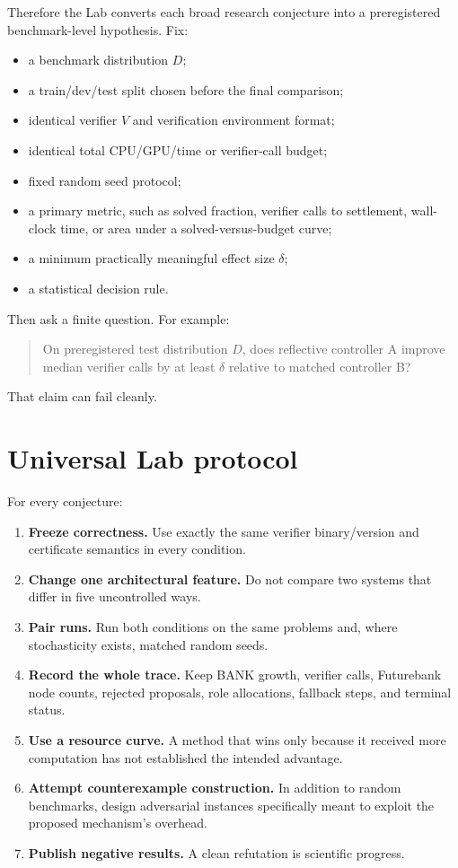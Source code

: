 \documentclass[11pt,openany]{book}
\theoremstyle{definition}
\theoremstyle{remark}
\begin{document}
Therefore the Lab converts each broad research conjecture into a preregistered benchmark-level hypothesis. Fix:
\begin{itemize}
\item a benchmark distribution $D$;
\item a train/dev/test split chosen before the final comparison;
\item identical verifier $V$ and verification environment format;
\item identical total CPU/GPU/time or verifier-call budget;
\item fixed random seed protocol;
\item a primary metric, such as solved fraction, verifier calls to settlement, wall-clock time, or area under a solved-versus-budget curve;
\item a minimum practically meaningful effect size $\delta$;
\item a statistical decision rule.
\end{itemize}
Then ask a finite question. For example:
\begin{quote}
On preregistered test distribution $D$, does reflective controller A improve median verifier calls by at least $\delta$ relative to matched controller B?
\end{quote}
That claim can fail cleanly.

\section{Universal Lab protocol}
For every conjecture:
\begin{enumerate}
\item \textbf{Freeze correctness.} Use exactly the same verifier binary/version and certificate semantics in every condition.
\item \textbf{Change one architectural feature.} Do not compare two systems that differ in five uncontrolled ways.
\item \textbf{Pair runs.} Run both conditions on the same problems and, where stochasticity exists, matched random seeds.
\item \textbf{Record the whole trace.} Keep BANK growth, verifier calls, Futurebank node counts, rejected proposals, role allocations, fallback steps, and terminal status.
\item \textbf{Use a resource curve.} A method that wins only because it received more computation has not established the intended advantage.
\item \textbf{Attempt counterexample construction.} In addition to random benchmarks, design adversarial instances specifically meant to exploit the proposed mechanism's overhead.
\item \textbf{Publish negative results.} A clean refutation is scientific progress.
\end{enumerate}
\end{document}
